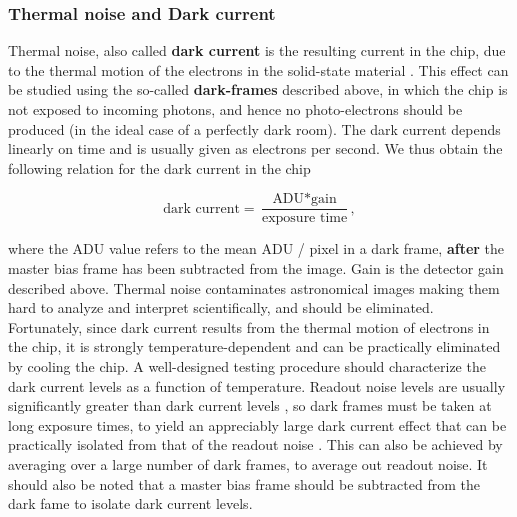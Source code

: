 \documentclass[../main.tex]{subfiles}
\begin{document}
	\subsubsection{Thermal noise and Dark current}
	Thermal noise, also called \textbf{dark current} is the resulting current in the chip, due to the thermal motion of the electrons in the solid-state material \cite{CCDdatareductionguide, handbookofccdastronomy}. This effect can be studied using the so-called \textbf{dark-frames} described above, in which the chip is not exposed to incoming photons, and hence no photo-electrons should be produced (in the ideal case of a perfectly dark room). The dark current depends linearly \cite{CCDdatareductionguide} on time and is usually given as electrons per second. We thus obtain the following relation for the dark current in the chip
	
	\begin{equation}\label{darkcurrenteq}
		\text{dark current} = \frac{\text{ADU} * \text{gain}}{\text{exposure time}},
	\end{equation}
	
	where the ADU value refers to the mean ADU / pixel in a dark frame, \textbf{after} the master bias frame has been subtracted from the image. Gain is the detector gain described above. Thermal noise contaminates astronomical images making them hard to analyze and interpret scientifically, and should be eliminated. Fortunately, since dark current results from the thermal motion of electrons in the chip, it is strongly temperature-dependent and can be practically eliminated by cooling the chip. A well-designed testing procedure should characterize the dark current levels as a function of temperature. Readout noise levels are usually significantly greater than dark current levels \cite{handbookofccdastronomy}, so dark frames must be taken at long exposure times, to yield an appreciably large dark current effect that can be practically isolated from that of the readout noise \cite{handbookofccdastronomy}. This can also be achieved by averaging over a large number of dark frames, to average out readout noise. It should also be noted that a master bias frame should be subtracted from the dark fame to isolate dark current levels. 
	
\end{document}
